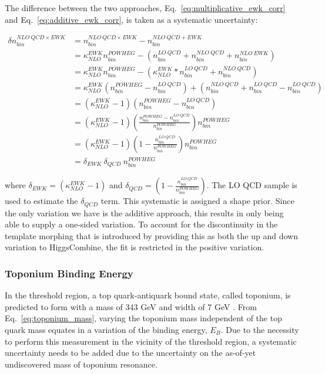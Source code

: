 The difference between the two approaches, Eq.~\ref{eq:multiplicative_ewk_corr} and Eq.~\ref{eq:additive_ewk_corr}, is taken as a systematic uncertainty: 

\begin{equation}
\label{eq:ewk_unc}
\begin{aligned}
  \delta n_{bin}^{NLO\ QCD \times EWK} &= n_{bin}^{NLO\ QCD \times EWK} - n_{bin}^{NLO\ QCD + EWK} \\
    &= \kappa_{NLO}^{EWK} n_{bin}^{POWHEG} - \left(n_{bin}^{LO\ QCD} + n_{bin}^{NLO\ QCD} + n_{bin}^{NLO\ EWK}\right) \\
    &= \kappa_{NLO}^{EWK} n_{bin}^{POWHEG} - \left(\kappa_{NLO}^{EWK} * n_{bin}^{LO\ QCD} + n_{bin}^{NLO\ QCD}\right) \\
    &=  \kappa_{NLO}^{EWK} \left( n_{bin}^{POWHEG} - n_{bin}^{LO\ QCD}\right) + \left(n_{bin}^{NLO\ QCD} + n_{bin}^{LO\ QCD} - n_{bin}^{LO\ QCD}\right) \\
    &=  \left(\kappa_{NLO}^{EWK} - 1\right) \left( n_{bin}^{POWHEG} - n_{bin}^{LO\ QCD}\right) \\
    &=  \left(\kappa_{NLO}^{EWK} - 1\right) \left( \frac{n_{bin}^{POWHEG} - n_{bin}^{LO\ QCD}}{n_{bin}^{POWHEG}}\right) n_{bin}^{POWHEG} \\
    &=  \left(\kappa_{NLO}^{EWK} - 1\right) \left(1 - \frac{n_{bin}^{LO\ QCD}}{n_{bin}^{POWHEG}}\right) n_{bin}^{POWHEG} \\
    &= \delta_{EWK}\ \delta_{QCD}\ n_{bin}^{POWHEG}
\end{aligned}
\end{equation}

where $\delta_{EWK} = \left(\kappa_{NLO}^{EWK} - 1\right)$ and $\delta_{QCD} = \left(1 - \frac{n_{bin}^{LO\ QCD}}{n_{bin}^{POWHEG}}\right)$. The LO QCD sample is used to estimate the $\delta_{QCD}$ term. This systematic is assigned a shape prior. Since the only variation we have is the additive approach, this results in only being able to supply a one-sided variation. To account for the discontinuity in the template morphing that is introduced by providing this as both the up and down variation to HiggsCombine, the fit is restricted in the positive variation.

\subsubsection{Toponium Binding Energy}
\label{sec:Toponium_Mass}
In the threshold region, a top quark-antiquark bound state, called toponium, is predicted to form with a mass of 343 GeV and width of 7 GeV \cite{bib:Fuks_2021}. From Eq.~\ref{eq:toponium_mass}, varying the toponium mass independent of the top quark mass equates in a variation of the binding energy, $E_B$. Due to the necessity to perform this measurement in the vicinity of the threshold region, a systematic uncertainty needs to be added due to the uncertainty on the as-of-yet undiscovered mass of toponium resonance. 

